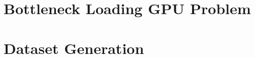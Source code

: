 \documentclass{article}
\begin{document}
\newpage
    
\newpage

\newpage
    \tableofcontents
\newpage






\section{Bottleneck Loading GPU Problem}
\section{Dataset Generation}



\end{document}
